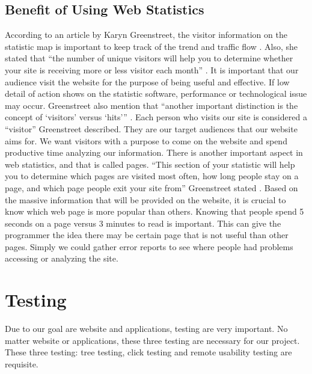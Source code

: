\documentclass[letterpaper,10pt, draftclsnofoot,onecolumn]{IEEEtran}
\begin{document}
{{{{{{{{{{{{{{{{{{\subsection[Benefit of Using Web Statistics]{\color{black}
Benefit of Using Web Statistics}
{\color{black}\normalsize\noindent
{According to an article by Karyn Greenstreet, the visitor information on the statistic map is important to keep track of the trend and traffic flow \cite{IEEEexample:article11}.
Also, she stated that “the number of unique visitors will help you to determine whether your site is receiving more or less visitor each month” \cite{IEEEexample:article11}.
It is important that our audience visit the website for the purpose of being useful and effective.
If low detail of action shows on the statistic software, performance or technological issue may occur. 
Greenstreet also mention that “another important distinction is the concept of ‘visitors’ versus ‘hits’” \cite{IEEEexample:article11}.
Each person who visits our site is considered a “visitor” Greenstreet described.
They are our target audiences that our website aims for. 
We want visitors with a purpose to come on the website and spend productive time analyzing our information. 
There is another important aspect in web statistics, and that is called pages. 
“This section of your statistic will help you to determine which pages are visited most often, how long people stay on a page, and which page people exit your site from” Greenstreet stated \cite{IEEEexample:article11}.
Based on the massive information that will be provided on the website, it is crucial to know which web page is more popular than others.
Knowing that people spend 5 seconds on a page versus 3 minutes to read is important. 
This can give the programmer the idea there may be certain page that is not useful than other pages. 
Simply we could gather error reports to see where people had problems accessing or analyzing the site.  
}

\section[Testing]{\color{black}
Testing}
\noindent Due to our goal are website and applications, testing are very important. No matter website or applications, these three testing are necessary for our project. These three testing: tree testing, click testing and remote usability testing are requisite. 

}}}}}}}}}}}}}}}}}}}
\end{document}
